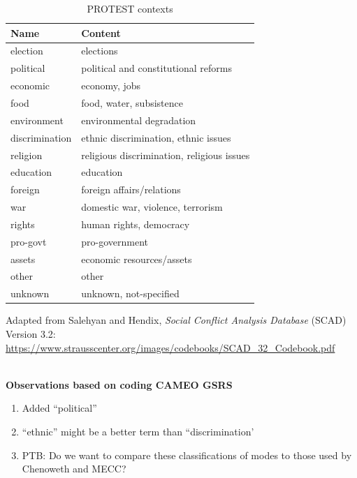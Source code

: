 \documentclass[11pt]{report}
\begin{document}
\begin{table}[htp]
\caption{PROTEST contexts}
\begin{center}
\begin{tabular}{|l|l|}
\hline
Name & Content \\
\hline
election   &   elections\\
political   &   political and constitutional reforms\\
economic &   economy, jobs\\
food           &   food, water, subsistence\\
environment            &   environmental degradation\\
discrimination            &   ethnic discrimination, ethnic issues\\
religion           &   religious discrimination, religious issues\\
education            &   education\\
foreign            &   foreign affairs/relations\\
war            &   domestic war, violence, terrorism\\
rights             &   human rights, democracy\\
pro-govt             &   pro-government\\
assets             &   economic resources/assets\\
other             &   other\\
unknown             &   unknown, not-specified\\    
\hline
\end{tabular}
\end{center}
\label{tab:protestcontext}
\raggedright{Adapted from Salehyan and Hendix, \textit{Social Conflict Analysis Database} (SCAD)
Version 3.2: \url{https://www.strausscenter.org/images/codebooks/SCAD\_32\_Codebook.pdf}}\\~

\textbf{Observations based on coding CAMEO GSRS}
\begin{enumerate}
\item Added ``political''
\item ``ethnic'' might be a better term than ``discrimination' 
\item PTB: Do we want to compare these classifications of modes to those used by Chenoweth and MECC?
\end{enumerate}

\end{table}%
\end{document}
